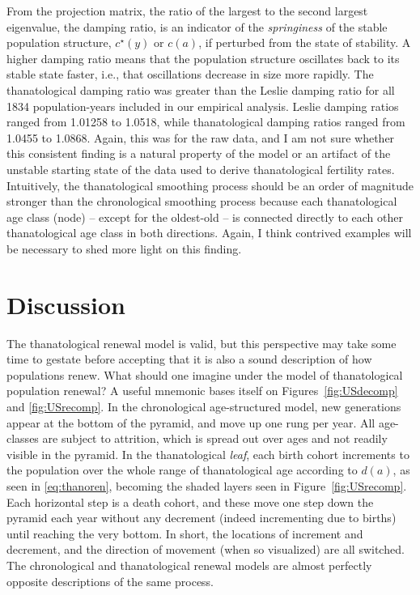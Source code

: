 \documentclass{article}
\begin{document}
From the projection matrix, the ratio of the largest to the second largest
eigenvalue, the damping ratio, is an indicator of the \textit{springiness} of
the stable population structure, $c^\star(y)$ or $c(a)$, if perturbed from the
state of stability.
A higher damping ratio means that the population structure oscillates back to
its stable state faster, i.e., that oscillations decrease in size more rapidly. The thanatological damping ratio was
greater than the Leslie damping ratio for all 1834 population-years included in
our empirical analysis. Leslie damping ratios ranged from 1.01258 to 1.0518,
while thanatological damping ratios ranged from 1.0455 to 1.0868. Again, this
was for the raw data, and I am not sure whether this consistent finding is a
natural property of the model or an artifact of the unstable starting state of
the data used to derive thanatological fertility rates. Intuitively, the
thanatological smoothing process should be an order of magnitude stronger than
the chronological smoothing process because each thanatological age class
(node) -- except for the oldest-old -- is connected directly to each other
thanatological age class in both directions. Again, I think contrived examples
will be necessary to shed more light on this finding.

\section{Discussion}
The thanatological renewal model is valid, but this perspective may take some
time to gestate before accepting that it is also a sound description of how
populations renew. What should one imagine under the model of thanatological
population renewal? A useful mnemonic bases itself on Figures~\ref{fig:USdecomp}
and \ref{fig:USrecomp}. In the chronological age-structured model, new
generations appear at the bottom of the pyramid, and move up one rung per year.
All age-classes are subject to attrition, which is spread out over ages and not
readily visible in the pyramid. In the thanatological \textit{leaf}, each birth cohort increments to the population over the whole range of thanatological age
according to $d(a)$, as seen in \eqref{eq:thanoren}, becoming the
shaded layers seen in Figure~\ref{fig:USrecomp}. Each horizontal step is a death
cohort, and these move one step down the pyramid each year without any decrement
(indeed incrementing due to births) until reaching the very bottom. In short,
the locations of increment and decrement, and the direction of movement (when
so visualized) are all switched. The chronological and thanatological renewal
models are almost perfectly opposite descriptions of the same process. 
\end{document}
